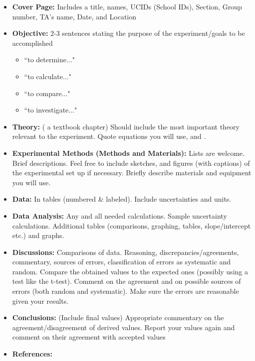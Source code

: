 \documentclass[12pt, a4paper, oneside, openright, titlepage]{book}
\begin{document}
\begin{appendices}
    \begin{itemize}
        \item \textbf{Cover Page:} Includes a title, names, UCIDs (School IDs), Section, Group number, TA's name, Date, and Location
        \item \textbf{Objective:} 2-3 sentences stating the purpose of the experiment/goals to be accomplished\begin{itemize}
                \item ``to determine..."
                \item ``to calculate..."
                \item ``to compare..."
                \item ``to investigate..."
        \end{itemize}
        \item \textbf{Theory:} ( a textbook chapter) Should include the most important theory relevant to the experiment. Quote  equations you will use, and .
        \item \textbf{Experimental Methods (Methods and Materials):} Lists are welcome. Brief descriptions. Feel free to include sketches, and figures (with captions) of the experimental set up if necessary. Briefly describe materials and equipment you will use.
        \item \textbf{Data:} In tables (numbered \& labeled). Include uncertainties and units. 
        \item \textbf{Data Analysis:} Any and all needed calculations. Sample uncertainty calculations. Additional tables (comparisons, graphing, tables, slope/intercept etc.) and graphs.
        \item \textbf{Discussions:} Comparisons of data. Reasoning, discrepancies/agreements, commentary, sources of errors, classification of errors as systematic and random. Compare the obtained values to the expected ones (possibly using a test like the t-test). Comment on the agreement and on possible sources of errors (both random and systematic). Make sure the errors are reasonable given your results.
        \item \textbf{Conclusions:} (Include final values) Appropriate commentary on the agreement/disagreement of derived values. Report your values again and comment on their agreement with accepted values
        \item \textbf{References:}
    \end{itemize}


\end{appendices}
\end{document}

